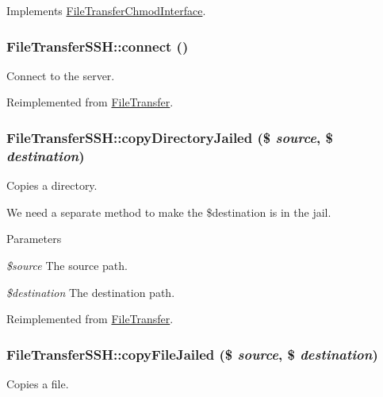 Implements \hyperlink{interfaceFileTransferChmodInterface_a031e451823be199251562369d1f760f0}{FileTransferChmodInterface}.\hypertarget{classFileTransferSSH_a3b153dcb920f531962fc4d4339683be8}{
\subsubsection[{connect}]{\setlength{\rightskip}{0pt plus 5cm}FileTransferSSH::connect ()}}
\label{classFileTransferSSH_a3b153dcb920f531962fc4d4339683be8}
Connect to the server. 

Reimplemented from \hyperlink{classFileTransfer_a78b9b9fdd3029295f73a5a41e052e311}{FileTransfer}.\hypertarget{classFileTransferSSH_abf0f85befe3b628d7cc6543b23fed228}{
\subsubsection[{copyDirectoryJailed}]{\setlength{\rightskip}{0pt plus 5cm}FileTransferSSH::copyDirectoryJailed (\$ {\em source}, \/  \$ {\em destination})}}
\label{classFileTransferSSH_abf0f85befe3b628d7cc6543b23fed228}
Copies a directory.

We need a separate method to make the \$destination is in the jail.


\begin{DoxyParams}{Parameters}
\item[{\em \$source}]The source path. \item[{\em \$destination}]The destination path. \end{DoxyParams}


Reimplemented from \hyperlink{classFileTransfer_a004c3757d055356cbbb99d122a5d686c}{FileTransfer}.\hypertarget{classFileTransferSSH_a300ba5b38e15b2411d927e95ae1c9258}{
\subsubsection[{copyFileJailed}]{\setlength{\rightskip}{0pt plus 5cm}FileTransferSSH::copyFileJailed (\$ {\em source}, \/  \$ {\em destination})}}
\label{classFileTransferSSH_a300ba5b38e15b2411d927e95ae1c9258}
Copies a file.


